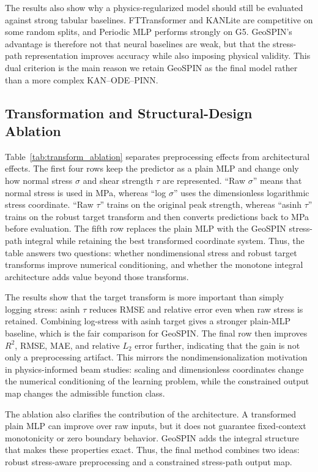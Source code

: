 \documentclass[journal]{IEEEtran}
\begin{document}
The results also show why a physics-regularized model should still be evaluated against strong tabular baselines. FTTransformer and KANLite are competitive on some random splits, and Periodic MLP performs strongly on G5. GeoSPIN's advantage is therefore not that neural baselines are weak, but that the stress-path representation improves accuracy while also imposing physical validity. This dual criterion is the main reason we retain GeoSPIN as the final model rather than a more complex KAN--ODE--PINN.

\subsection{Transformation and Structural-Design Ablation}


Table~\ref{tab:transform_ablation} separates preprocessing effects from architectural effects. The first four rows keep the predictor as a plain MLP and change only how normal stress $\sigma$ and shear strength $\tau$ are represented. ``Raw $\sigma$'' means that normal stress is used in MPa, whereas ``log $\sigma$'' uses the dimensionless logarithmic stress coordinate. ``Raw $\tau$'' trains on the original peak strength, whereas ``asinh $\tau$'' trains on the robust target transform and then converts predictions back to MPa before evaluation. The fifth row replaces the plain MLP with the GeoSPIN stress-path integral while retaining the best transformed coordinate system. Thus, the table answers two questions: whether nondimensional stress and robust target transforms improve numerical conditioning, and whether the monotone integral architecture adds value beyond those transforms.

The results show that the target transform is more important than simply logging stress: asinh $\tau$ reduces RMSE and relative error even when raw stress is retained. Combining log-stress with asinh target gives a stronger plain-MLP baseline, which is the fair comparison for GeoSPIN. The final row then improves $R^2$, RMSE, MAE, and relative $L_2$ error further, indicating that the gain is not only a preprocessing artifact. This mirrors the nondimensionalization motivation in physics-informed beam studies: scaling and dimensionless coordinates change the numerical conditioning of the learning problem, while the constrained output map changes the admissible function class.

The ablation also clarifies the contribution of the architecture. A transformed plain MLP can improve over raw inputs, but it does not guarantee fixed-context monotonicity or zero boundary behavior. GeoSPIN adds the integral structure that makes these properties exact. Thus, the final method combines two ideas: robust stress-aware preprocessing and a constrained stress-path output map.
\end{document}
